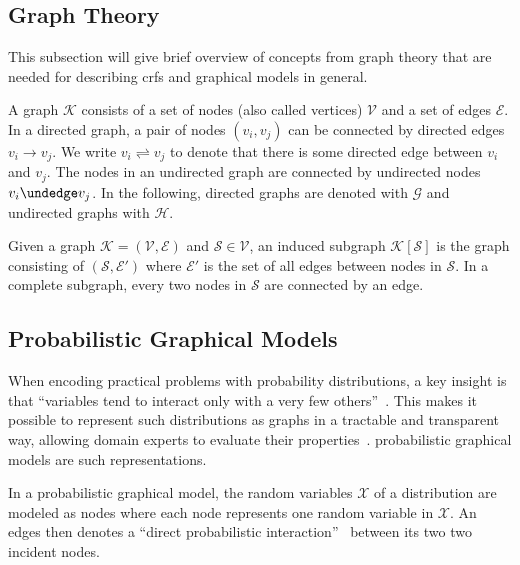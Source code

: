 \subsection{Graph Theory}\label{subsec:graph-theory}

This subsection will give brief overview of concepts from graph theory that are needed for describing \glspl{crf} and graphical models in general.

\bigskip

A \gls{graph} $\mathcal{K}$ consists of a set of \glspl{node} (also called vertices) $\mathcal{V}$ and a set of \glspl{edge} $\mathcal{E}$.
In a directed \gls{graph}, a pair of \glspl{node} $(v_i,v_j)$ can be connected by directed \glspl{edge} $v_i\to v_j$.
We write $v_i\rightleftharpoons v_j$ to denote that there is some directed edge between $v_i$ and $v_j$.
The \glspl{node} in an undirected graph are connected by undirected \glspl{node} $v_i\undedge v_j$.
In the following, directed \glspl{graph} are denoted with $\mathcal{G}$ and undirected \glspl{graph} with $\mathcal{H}$.

Given a \gls{graph} $\mathcal{K} = (\mathcal{V},\mathcal{E})$ and $\mathcal{S}\in\mathcal{V}$, an induced \gls{subgraph} $\mathcal{K}[\mathcal{S}]$ is the \gls{graph} consisting of $(\mathcal{S},\mathcal{E'})$ where $\mathcal{E'}$ is the set of all \glspl{edge} between \glspl{node} in $\mathcal{S}$.
In a complete \gls{subgraph}, every two \glspl{node} in $\mathcal{S}$ are connected by an \gls{edge}.

\subsection{Probabilistic Graphical Models}\label{subsec:graphical-models}
When encoding practical problems with \glspl{probability distribution}, a key insight is that ``variables tend to interact only with a very few others''~\citep{koller2009probabilistic}.
This makes it possible to represent such distributions as graphs in a tractable and transparent way, allowing domain experts to evaluate their properties~\citep{koller2009probabilistic}.
\Glspl{probabilistic graphical model} are such representations.

\bigskip

In a \gls{probabilistic graphical model}, the \glspl{random variable} $\mathcal{X}$ of a distribution are modeled as \glspl{node} where each \gls{node} represents one \gls{random variable} in $\mathcal{X}$. An \glspl{edge} then denotes a ``direct probabilistic interaction''~\citep{koller2009probabilistic} between its two two incident \glspl{node}.

